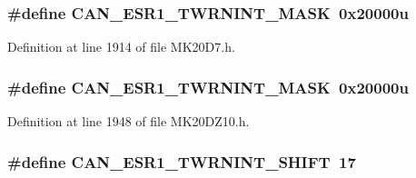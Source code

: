 \subsubsection[{\texorpdfstring{C\+A\+N\+\_\+\+E\+S\+R1\+\_\+\+T\+W\+R\+N\+I\+N\+T\+\_\+\+M\+A\+SK}{CAN_ESR1_TWRNINT_MASK}}]{\setlength{\rightskip}{0pt plus 5cm}\#define C\+A\+N\+\_\+\+E\+S\+R1\+\_\+\+T\+W\+R\+N\+I\+N\+T\+\_\+\+M\+A\+SK~0x20000u}\hypertarget{group___c_a_n___register___masks_gaf6b96813ed300d4649d7daec40351861}{}\label{group___c_a_n___register___masks_gaf6b96813ed300d4649d7daec40351861}


Definition at line 1914 of file M\+K20\+D7.\+h.

\subsubsection[{\texorpdfstring{C\+A\+N\+\_\+\+E\+S\+R1\+\_\+\+T\+W\+R\+N\+I\+N\+T\+\_\+\+M\+A\+SK}{CAN_ESR1_TWRNINT_MASK}}]{\setlength{\rightskip}{0pt plus 5cm}\#define C\+A\+N\+\_\+\+E\+S\+R1\+\_\+\+T\+W\+R\+N\+I\+N\+T\+\_\+\+M\+A\+SK~0x20000u}\hypertarget{group___c_a_n___register___masks_gaf6b96813ed300d4649d7daec40351861}{}\label{group___c_a_n___register___masks_gaf6b96813ed300d4649d7daec40351861}


Definition at line 1948 of file M\+K20\+D\+Z10.\+h.

\subsubsection[{\texorpdfstring{C\+A\+N\+\_\+\+E\+S\+R1\+\_\+\+T\+W\+R\+N\+I\+N\+T\+\_\+\+S\+H\+I\+FT}{CAN_ESR1_TWRNINT_SHIFT}}]{\setlength{\rightskip}{0pt plus 5cm}\#define C\+A\+N\+\_\+\+E\+S\+R1\+\_\+\+T\+W\+R\+N\+I\+N\+T\+\_\+\+S\+H\+I\+FT~17}\hypertarget{group___c_a_n___register___masks_ga651c6aee47d004060a9dbc10369cf784}{}\label{group___c_a_n___register___masks_ga651c6aee47d004060a9dbc10369cf784}


